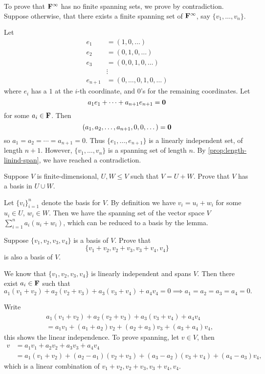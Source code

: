 \begin{solution}
To prove that $\mathbf F^\infty$ has no finite spanning sets, we prove by contradiction. Suppose otherwise, that there exists a finite spanning set of $\mathbf F^\infty$, say $\{v_1,\dots,v_n\}$.

Let
\begin{align*}
e_1&=(1,0,\dots)\\
e_2&=(0,1,0,\dots)\\
e_3&=(0,0,1,0,\dots)\\
&\vdots\\
e_{n+1}&=(0,\dots,0,1,0,\dots)
\end{align*}
where $e_i$ has a $1$ at the $i$-th coordinate, and $0$'s for the remaining coordinates. Let
\[a_1e_1+\cdots+a_{n+1}e_{n+1}=\vb{0}\]
for some $a_i\in\mathbf F$. Then
\[(a_1,a_2,\dots,a_{n+1},0,0,\dots)=\vb{0}\]
so $a_1=a_2=\cdots=a_{n+1}=0$. Thus $\{e_1,\dots,e_{n+1}\}$ is a linearly independent set, of length $n+1$. However, $\{v_1,\dots,v_n\}$ is a spanning set of length $n$. By \cref{prop:length-linind-span}, we have reached a contradiction.
\end{solution}

\begin{exercise}
Suppose $V$ is finite-dimensional, $U,W\le V$ such that $V=U+W$. Prove that $V$ has a basis in $U\cup W$.
\end{exercise}

\begin{solution}
Let $\{v_i\}_{i=1}^n$ denote the basis for $V$. By definition we have $v_i=u_i+w_i$ for some $u_i\in U$, $w_i\in W$. Then we have the spanning set of the vector space $V$ $\sum_{i=1}^{n}a_i(u_i+w_i)$, which can be reduced to a basis by the lemma.
\end{solution}

\begin{exercise}
Suppose $\{v_1,v_2,v_3,v_4\}$ is a basis of $V$. Prove that
\[\{v_1+v_2,v_2+v_3,v_3+v_4,v_4\}\]
is also a basis of $V$.
\end{exercise}

\begin{solution}
We know that $\{v_1,v_2,v_3,v_4\}$ is linearly independent and spans $V$. Then there exist $a_i\in\mathbf F$ such that
\[a_1(v_1+v_2)+a_2(v_2+v_3)+a_3(v_3+v_4)+a_4v_4=0\implies a_1=a_2=a_3=a_4=0.\]

Write
\begin{align*}
&a_1(v_1+v_2)+a_2(v_2+v_3)+a_3(v_3+v_4)+a_4v_4\\
&=a_1v_1+(a_1+a_2)v_2+(a_2+a_3)v_3+(a_3+a_4)v_4,
\end{align*}
this shows the linear independence. To prove spanning, let $v\in V$, then
\begin{align*}
v&=a_1v_1+a_2v_2+a_3v_3+a_4v_4\\
&=a_1(v_1+v_2)+(a_2-a_1)(v_2+v_3)+(a_3-a_2)(v_3+v_4)+(a_4-a_3)v_4,
\end{align*}
which is a linear combination of $v_1+v_2,v_2+v_3,v_3+v_4,v_4$.
\end{solution}

